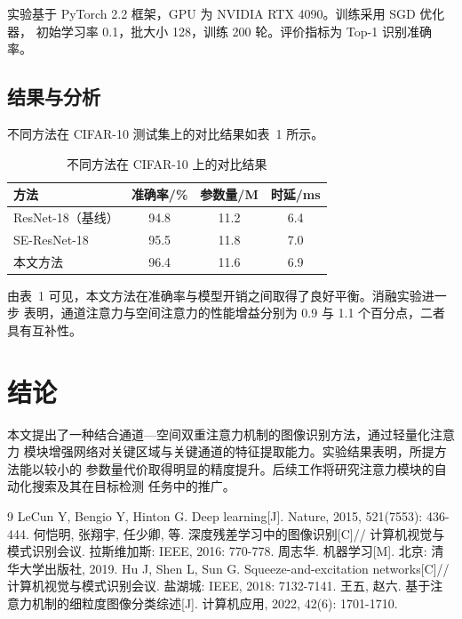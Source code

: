 \documentclass[twocolumn,zihao=5,a4paper]{ctexart}
\begin{document}
\quad 实验基于 PyTorch 2.2 框架，GPU 为 NVIDIA RTX 4090。训练采用 SGD 优化器，
初始学习率 0.1，批大小 128，训练 200 轮。评价指标为 Top-1 识别准确率。

\subsection{结果与分析}

\quad 不同方法在 CIFAR-10 测试集上的对比结果如表~1 所示。

\begin{table}[htbp]
  \centering
  \caption{不同方法在 CIFAR-10 上的对比结果}
  \begin{tabular}{lccc}
    \toprule
    方法 & 准确率/\% & 参数量/M & 时延/ms \\
    \midrule
    ResNet-18（基线） & 94.8 & 11.2 & 6.4 \\
    SE-ResNet-18      & 95.5 & 11.8 & 7.0 \\
    本文方法          & 96.4 & 11.6 & 6.9 \\
    \bottomrule
  \end{tabular}
\end{table}

\quad 由表~1 可见，本文方法在准确率与模型开销之间取得了良好平衡。消融实验进一步
表明，通道注意力与空间注意力的性能增益分别为 0.9 与 1.1 个百分点，二者具有互补性。

\section{结\quad 论}

\quad 本文提出了一种结合通道—空间双重注意力机制的图像识别方法，通过轻量化注意力
模块增强网络对关键区域与关键通道的特征提取能力。实验结果表明，所提方法能以较小的
参数量代价取得明显的精度提升。后续工作将研究注意力模块的自动化搜索及其在目标检测
任务中的推广。

\begin{thebibliography}{9}
   LeCun Y, Bengio Y, Hinton G. Deep learning[J]. Nature, 2015, 521(7553): 436-444.
   何恺明, 张翔宇, 任少卿, 等. 深度残差学习中的图像识别[C]//
    计算机视觉与模式识别会议. 拉斯维加斯: IEEE, 2016: 770-778.
   周志华. 机器学习[M]. 北京: 清华大学出版社, 2019.
   Hu J, Shen L, Sun G. Squeeze-and-excitation networks[C]//
    计算机视觉与模式识别会议. 盐湖城: IEEE, 2018: 7132-7141.
   王五, 赵六. 基于注意力机制的细粒度图像分类综述[J]. 计算机应用, 2022, 42(6): 1701-1710.
\end{thebibliography}
\end{document}
